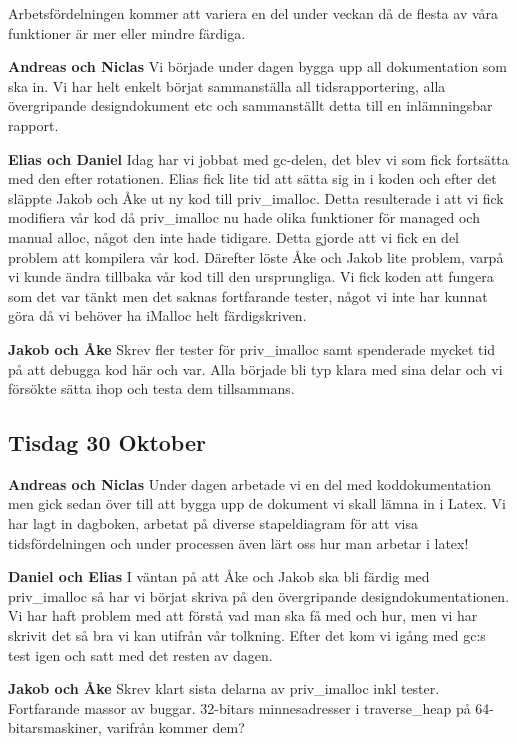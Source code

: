 \documentclass{article}
\begin{document}
Arbetsfördelningen kommer att variera en del under veckan då de flesta av våra funktioner är mer eller mindre färdiga.

{\bf Andreas och Niclas} Vi började under dagen bygga upp all dokumentation som ska in. Vi har helt enkelt börjat sammanställa all tidsrapportering, alla övergripande designdokument etc och sammanställt detta till en inlämningsbar rapport.

{\bf Elias och Daniel} Idag har vi jobbat med gc-delen, det blev vi som fick fortsätta med den efter rotationen. Elias fick lite tid att sätta sig in i koden och efter det släppte Jakob och Åke ut ny kod till priv\_imalloc. Detta resulterade i att vi fick modifiera vår kod då priv\_imalloc nu hade olika funktioner för managed och manual alloc, något den inte hade tidigare. Detta gjorde att vi fick en del problem att kompilera vår kod. Därefter löste Åke och Jakob lite problem, varpå vi kunde ändra tillbaka vår kod till den ursprungliga. Vi fick koden att fungera som det var tänkt men det saknas fortfarande tester, något vi inte har kunnat göra då vi behöver ha iMalloc helt färdigskriven.

{\bf Jakob och Åke}
Skrev fler tester för priv\_imalloc samt spenderade mycket tid på att debugga kod här och var. Alla började bli typ klara med sina delar och vi försökte sätta ihop och testa dem tillsammans.

\subsection{Tisdag 30 Oktober}

{\bf Andreas och Niclas}
Under dagen arbetade vi en del med koddokumentation men gick sedan över till att bygga upp de dokument vi skall lämna in i Latex. Vi har lagt in dagboken, arbetat på diverse stapeldiagram för att visa tidsfördelningen och under processen även lärt oss hur man arbetar i latex!

{\bf Daniel och Elias}
I väntan på att Åke och Jakob ska bli färdig med priv\_imalloc så har vi börjat skriva på den övergripande designdokumentationen. Vi har haft problem med att förstå vad man ska få med och hur, men vi har skrivit det så bra vi kan utifrån vår tolkning. Efter det kom vi igång med gc:s test igen och satt med det resten av dagen.

{\bf Jakob och Åke}
Skrev klart sista delarna av priv\_imalloc inkl tester. Fortfarande massor av buggar. 32-bitars minnesadresser i traverse\_heap på 64-bitarsmaskiner, varifrån kommer dem?
\end{document}
